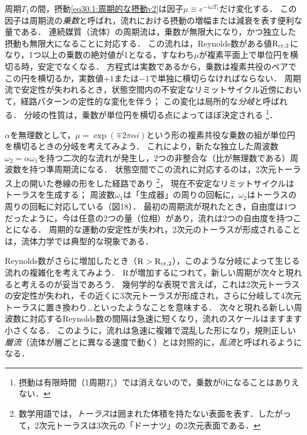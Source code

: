 周期$T_1$の間，摂動\eqref{eq30.1:周期的な摂動v2}は因子$\mu\equiv e^{-i\omega T_1}$だけ変化する．
この因子は周期流の\emph{乗数}と呼ばれ，流れにおける摂動の増幅または減衰を表す便利な量である．
連続媒質（流体）の周期流は，乗数が無限大になり，かつ独立した摂動も無限大になることに対応する．
この流れは，Reynolds数がある値$\mathrm{R}_\mathrm{cr,2}$になり，1つ以上の乗数の絶対値が1となる，すなわち$\mu$が複素平面上で単位円を横切る時，安定でなくなる．
方程式は実数であるから，乗数は複素共役のペアでこの円を横切るか，実数値$+1$または$-1$で単独に横切らなければならない．
周期流で安定性が失われるとき，状態空間内の不安定なリミットサイクル近傍において，経路パターンの定性的な変化を伴う；
この変化は局所的な\emph{分岐}と呼ばれる．
分岐の性質は，乗数が単位円を横切る点によってほぼ決定される
\footnote{摂動は有限時間（1周期$T_1$）では消えないので，乗数が0になることはありえない．}．



$\alpha$を無理数として，$\mu=\exp(\mp 2\pi\alpha i)$という形の複素共役な乗数の組が単位円を横切るときの分岐を考えてみよう．
これにより，新たな独立した周波数$\omega_2=\alpha\omega_1$を持つ二次的な流れが発生し，2つの非整合な（比が無理数である）周波数を持つ準周期流になる．
状態空間でこの流れに対応するのは，2次元トーラス上の開いた巻線の形をした経路であり
\footnote{数学用語では，\emph{トーラス}は囲まれた体積を持たない表面を表す．したがって，2次元トーラスは3次元の「ドーナツ」の2次元表面である．}，
現在不安定なリミットサイクルはトーラスを生成する；
周波数$\omega_1$は「生成器」の周りの回転に，$\omega_2$はトーラスの周りの回転に対応している（図18）．
最初の周期流が現れたとき，自由度は1つだったように，今は任意の2つの量（位相）があり，流れは2つの自由度を持つことになる．
周期的な運動の安定性が失われ，2次元のトーラスが形成されることは，流体力学では典型的な現象である．


Reynolds数がさらに増加したとき（$\mathrm{R}>\mathrm{R}_\mathrm{cr,2}$），このような分岐によって生じる流れの複雑化を考えてみよう．
$\mathrm{R}$が増加するにつれて，新しい周期が次々と現れると考えるのが妥当であろう．
幾何学的な表現で言えば，これは2次元トーラスの安定性が失われ，その近くに3次元トーラスが形成され，さらに分岐して4次元トーラスに置き換わり…といったようなことを意味する．
次々と現れる新しい周波数に対応するReynolds数の間隔は急速に短くなり，流れのスケールはますます小さくなる．
このように，流れは急速に複雑で混乱した形になり，規則正しい\emph{層流}（流体が層ごとに異なる速度で動く）とは対照的に，\emph{乱流}と呼ばれるようになる．




